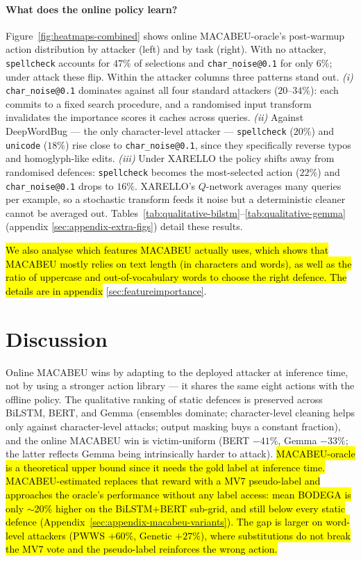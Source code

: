 \documentclass[11pt]{article}
\begin{document}
\paragraph{What does the online policy learn?}
Figure~\ref{fig:heatmaps-combined} shows online MACABEU-oracle's post-warmup action distribution by attacker (left) and by task (right). With no attacker, \texttt{spellcheck} accounts for $47\%$ of selections and \texttt{char\_noise@0.1} for only $6\%$; under attack these flip. Within the attacker columns three patterns stand out. \emph{(i)} \texttt{char\_noise@0.1} dominates against all four standard attackers ($20$--$34\%$): each commits to a fixed search procedure, and a randomised input transform invalidates the importance scores it caches across queries. \emph{(ii)} Against DeepWordBug --- the only character-level attacker --- \texttt{spellcheck} ($20\%$) and \texttt{unicode} ($18\%$) rise close to \texttt{char\_noise@0.1}, since they specifically reverse typos and homoglyph-like edits. \emph{(iii)} Under XARELLO the policy shifts away from randomised defences: \texttt{spellcheck} becomes the most-selected action ($22\%$) and \texttt{char\_noise@0.1} drops to $16\%$. XARELLO's $Q$-network averages many queries per example, so a stochastic transform feeds it noise but a deterministic cleaner cannot be averaged out. Tables~\ref{tab:qualitative-bilstm}--\ref{tab:qualitative-gemma} (appendix \ref{sec:appendix-extra-figs}) detail these results.

\hl{We also analyse which features MACABEU actually uses, which shows that MACABEU mostly relies on text length (in characters and words), as well as the ratio of uppercase and out-of-vocabulary words to choose the right defence. The details are in appendix} \ref{sec:featureimportance}. 

\section{Discussion}

Online MACABEU wins by adapting to the deployed attacker at inference time, not by using a stronger action library --- it shares the same eight actions with the offline policy. The qualitative ranking of static defences is preserved across BiLSTM, BERT, and Gemma (ensembles dominate; character-level cleaning helps only against character-level attacks; output masking buys a constant fraction), and the online MACABEU win is victim-uniform (BERT $-41\%$, Gemma $-33\%$; the latter reflects Gemma being intrinsically harder to attack). \hl{MACABEU-oracle is a theoretical upper bound since it needs the gold label at inference time. MACABEU-estimated replaces that reward with a MV7 pseudo-label and approaches the oracle's performance without any label access: mean BODEGA is only $\sim$20\% higher on the BiLSTM+BERT sub-grid, and still below every static defence (Appendix~\ref{sec:appendix-macabeu-variants}). The gap is larger on word-level attackers (PWWS $+60\%$, Genetic $+27\%$), where substitutions do not break the MV7 vote and the pseudo-label reinforces the wrong action.}
\end{document}
